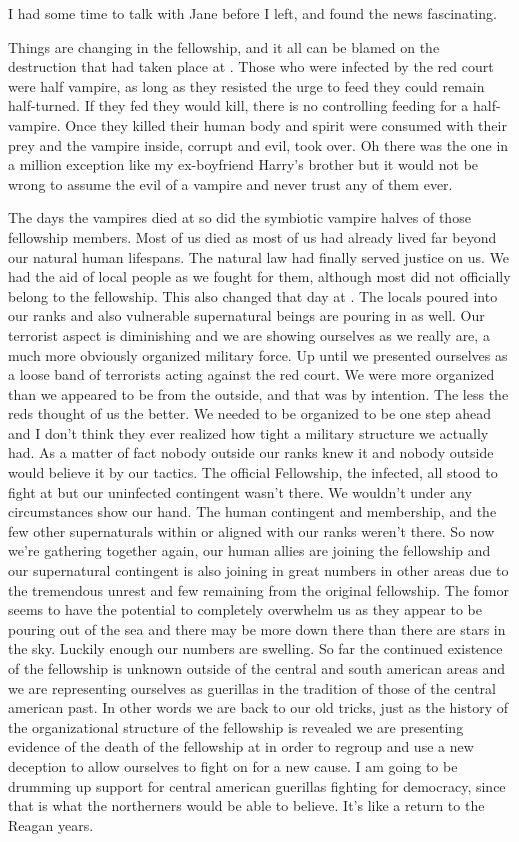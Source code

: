 I had some time to talk with Jane before I left, and found the news fascinating.

 Things are changing in the fellowship, and it all can be blamed on the destruction that had taken place at \chichenitza*. Those who were infected by the red court were half vampire, as long as they resisted the urge to feed they could remain half-turned. If they fed they would kill, there is no controlling feeding for a half-vampire. Once they killed their human body and spirit were consumed with their prey and the vampire inside, corrupt and evil, took over. Oh there was the one in a million exception like my ex-boyfriend Harry's brother but it would not be wrong to assume the evil of a vampire and never trust any of them ever.

 The days the vampires died at \chichenitza* so did the symbiotic vampire halves of those fellowship members. Most of us died as most of us had already lived far beyond our natural human lifespans. The natural law had finally served justice on us. We had the aid of local people as we fought for them, although most did not officially belong to the fellowship. This also changed that day at \chichenitza*. The locals poured into our ranks and also vulnerable supernatural beings are pouring in as well. Our terrorist aspect is diminishing and we are showing ourselves as we really are, a much more obviously organized military force. Up until \chichenitza* we presented ourselves as a loose band of terrorists acting against the red court. We were more organized than we appeared to be from the outside, and that was by intention. The less the reds thought of us the better. We needed to be organized to be one step ahead and I don't think they ever realized how tight a military structure we actually had. As a matter of fact nobody outside our ranks knew it and nobody outside would believe it by our tactics. The official Fellowship, the infected, all stood to fight at \chichenitza* but our uninfected contingent wasn't there. We wouldn't under any circumstances show our hand. The human contingent and membership, and the few other supernaturals within or aligned with our ranks weren't there. So now we're gathering together again, our human allies are joining the fellowship and our supernatural contingent is also joining in great numbers in other areas due to the tremendous unrest and few remaining from the original fellowship. The fomor seems to have the potential to completely overwhelm us as they appear to be pouring out of the sea and there may be more down there than there are stars in the sky. Luckily enough our numbers are swelling. So far the continued existence of the fellowship is unknown outside of the central and south american areas and we are representing ourselves as guerillas in the tradition of those of the central american past. In other words we are back to our old tricks, just as the history of the organizational structure of the fellowship is revealed we are presenting evidence of the death of the fellowship at \chichenitza* in order to regroup and use a new deception to allow ourselves to fight on for a new cause. I am going to be drumming up support for central american guerillas fighting for democracy, since that is what the northerners would be able to believe. It's like a return to the Reagan years.